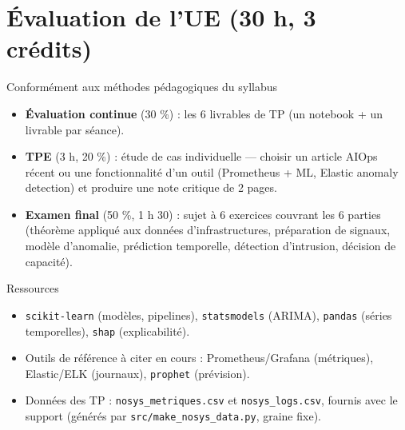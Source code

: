 \documentclass[11pt,a4paper]{article}
\begin{document}
\section*{Évaluation de l'UE (30 h, 3 crédits)}
\begin{seancebox}{Conformément aux méthodes pédagogiques du syllabus}
\begin{itemize}[nosep]
\item \textbf{Évaluation continue} (30 \%) : les 6 livrables de TP (un notebook + un livrable par séance).
\item \textbf{TPE} (3 h, 20 \%) : étude de cas individuelle — choisir un article AIOps récent ou une fonctionnalité d'un outil (Prometheus + ML, Elastic anomaly detection) et produire une note critique de 2 pages.
\item \textbf{Examen final} (50 \%, 1 h 30) : sujet à 6 exercices couvrant les 6 parties (théorème appliqué aux données d'infrastructures, préparation de signaux, modèle d'anomalie, prédiction temporelle, détection d'intrusion, décision de capacité).
\end{itemize}
\end{seancebox}

\begin{seancebox}{Ressources}
\begin{itemize}[nosep]
\item \texttt{scikit-learn} (modèles, pipelines), \texttt{statsmodels} (ARIMA), \texttt{pandas} (séries temporelles), \texttt{shap} (explicabilité).
\item Outils de référence à citer en cours : Prometheus/Grafana (métriques), Elastic/ELK (journaux), \texttt{prophet} (prévision).
\item Données des TP : \texttt{nosys\_metriques.csv} et \texttt{nosys\_logs.csv}, fournis avec le support (générés par \texttt{src/make\_nosys\_data.py}, graine fixe).
\end{itemize}
\end{seancebox}
\end{document}
